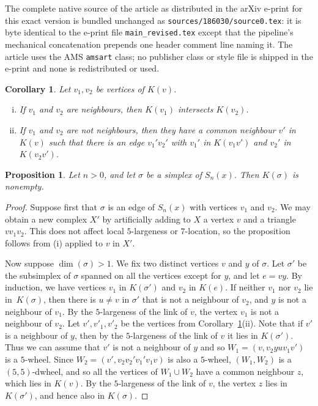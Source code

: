 \documentclass[10pt,a4paper]{amsart}
\newtheorem{prop}{Proposition}
\newtheorem{cor}{Corollary}
\begin{document}
The complete native source of the article as distributed in the arXiv e-print for this exact version is bundled unchanged as \texttt{sources/186030/source0.tex}: it is byte identical to the e-print file \texttt{main\_revised.tex} except that the pipeline's mechanical concatenation prepends one header comment line naming it. The article uses the AMS \texttt{amsart} class; no publisher class or style file is shipped in the e-print and none is redistributed or used.
\begin{cor} \label{prop: diam of K}
Let $v_1,v_2$ be vertices of $K(v)$.
\begin{enumerate}[(i)]
    \item If $v_1$ and $v_2$ are neighbours, then $K(v_1)$ intersects $ K(v_2)$.
    \item If $v_1$ and $v_2$ are not neighbours, then 
    they have a common neighbour $v'$ in~$K(v)$ such that there is an edge $v_1'v_2'$ with $v_1'$ in $K(v_1v')$ and $v_2'$ in $K(v_2v')$.
\end{enumerate}
\end{cor}

\begin{prop}
\label{prop:nonempty}
   Let $n > 0$, and let $\sigma$ be a simplex of $S_n(x)$. Then $K(\sigma)$ is nonempty.
\end{prop}

\begin{proof}
    Suppose first that $\sigma$ is an edge of $S_n(x)$ with vertices $v_1$ and $v_2$. We may obtain a new complex $X'$ by artificially adding to $X$ a vertex $v$ and a triangle $vv_1v_2$.
    This does not affect local $5$-largeness or $7$-location, so the proposition follows from (i) applied to $v$ in $X'$.

    Now suppose $\dim(\sigma) > 1$. We fix two distinct vertices $v$ and $y$ of $\sigma$. Let $\sigma'$ be the subsimplex of $\sigma$ spanned on all the vertices except for $y$, and let $e=vy$.
    By induction, 
    we have vertices $v_1$ in $K(\sigma')$ and $v_2$ in $K(e)$.
    If neither $v_1$ nor $v_2$ lie in~$K(\sigma)$, then there is $u\neq v$ in $\sigma'$ that is not a neighbour of $v_2$, and $y$ is not a neighbour of $v_1$. By the $5$-largeness of the link of $v$, the vertex $v_1$ is not a neighbour of $v_2$. Let $v',v'_1,v'_2$ be the vertices from Corollary~\ref{prop: diam of K}(ii). Note that if $v'$ is a neighbour of $y$, then by the $5$-largeness of the link of $v$ it lies in $K(\sigma')$. Thus we can assume that $v'$ is not a neighbour of $y$ and so $W_1=(v, v_2yuv_1v')$ is a $5$-wheel. Since $W_2=(v',v_2v_2'v_1'v_1v)$ is also a $5$-wheel, $(W_1,W_2)$ 
    is a $(5,5)$-dwheel, and so all the vertices of $W_1\cup W_2$ have a common neighbour $z$, which lies in $K(v)$. By the $5$-largeness of the link of $v$, the vertex $z$ lies in $K(\sigma')$, and hence also in $K(\sigma)$.
\end{proof}
\end{document}
